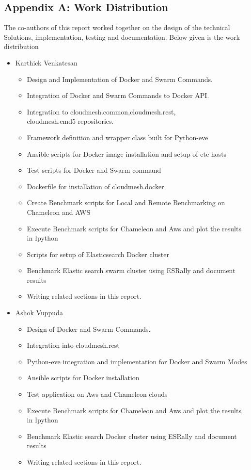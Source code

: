 \documentclass[9pt,twocolumn,twoside]{../../styles/osajnl}
\begin{document}
\subsection{Appendix A: Work Distribution}
The co-authors of this report worked together on the design of the technical
Solutions, implementation, testing and documentation. Below given is the work
 distribution
\begin{itemize}
\item Karthick Venkatesan
    \begin{itemize}
    \item Design and Implementation of Docker and Swarm Commands.
    \item Integration of Docker and Swarm Commands to Docker API.
    \item Integration to cloudmesh.common,cloudmesh.rest,\\
cloudmesh.cmd5 repositories.
    \item Framework definition and wrapper class built for Python-eve
    \item Ansible scripts for Docker image installation  and setup of etc hosts
    \item Test scripts for Docker and Swarm command
    \item Dockerfile for installation of cloudmesh.docker
    \item Create Benchmark scripts for Local and Remote Benchmarking on Chameleon and AWS
    \item Execute Benchmark scripts for Chameleon and Aws and plot the results in Ipython
    \item Scripts for setup of Elasticsearch Docker cluster
    \item Benchmark Elastic search swarm  cluster using ESRally and document results
    \item Writing related sections in this report.
    \end{itemize}

\item Ashok Vuppuda
    \begin{itemize}
    \item Design of Docker and Swarm Commands.
    \item Integration into cloudmesh.rest
    \item Python-eve integration and implementation for Docker and Swarm Modes
    \item Ansible scripts for Docker installation
    \item Test application on Aws and Chameleon clouds
    \item Execute Benchmark scripts for Chameleon and Aws and plot the results in Ipython
    \item Benchmark Elastic search Docker  cluster using ESRally and document results
    \item Writing related sections in this report.
    \end{itemize}
\end{itemize}
\end{document}
